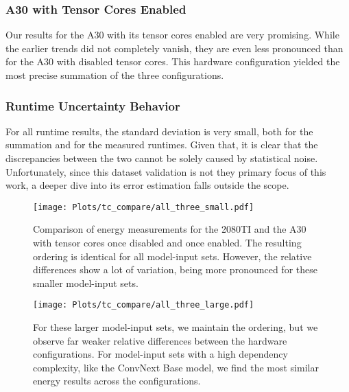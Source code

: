 \subsubsection{A30 with Tensor Cores Enabled}
Our results for the A30 with its tensor cores enabled are very promising. While the earlier trends did not completely vanish, they are even less pronounced than for the A30 with disabled tensor cores. This hardware configuration yielded the most precise summation of the three configurations.

\subsubsection{Runtime Uncertainty Behavior}
For all runtime results, the standard deviation is very small, both for the summation and for the measured runtimes. Given that, it is clear that the discrepancies between the two cannot be solely caused by statistical noise. \\
Unfortunately, since this dataset validation is not they primary focus of this work, a deeper dive into its error estimation falls outside the scope.

\begin{figure}
    \center\texttt{[image: Plots/tc\_compare/all\_three\_small.pdf]}
    \caption{Comparison of energy measurements for the 2080TI and the A30 with tensor cores once disabled and once enabled. The resulting ordering is identical for all model-input sets. However, the relative differences show a lot of variation, being more pronounced for these smaller model-input sets.}
    \label{fig:tcnotcsmall}
    \texttt{[image: Plots/tc\_compare/all\_three\_large.pdf]}
    \caption{For these larger model-input sets, we maintain the ordering, but we observe far weaker relative differences between the hardware configurations. For model-input sets with a high dependency complexity, like the ConvNext Base model, we find the most similar energy results across the configurations.}
    \label{fig:tcnotclarge}
\end{figure}


\setcounter{savedpage}{\value{page}}






\setcounter{page}{\numexpr\value{savedpage}+4\relax}


